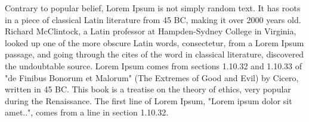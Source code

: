 \documentclass[12pt,letterpaper]{article} %
\begin{document}
	Contrary to popular belief, Lorem Ipsum is not simply random text. It has roots in a piece of classical Latin literature from 45 BC, making it over 2000 years old. Richard McClintock, a Latin professor at Hampden-Sydney College in Virginia, looked up one of the more obscure Latin words, consectetur, from a Lorem Ipsum passage, and going through the cites of the word in classical literature, discovered the undoubtable source. Lorem Ipsum comes from sections 1.10.32 and 1.10.33 of "de Finibus Bonorum et Malorum" (The Extremes of Good and Evil) by Cicero, written in 45 BC. This book is a treatise on the theory of ethics, very popular during the Renaissance. The first line of Lorem Ipsum, "Lorem ipsum dolor sit amet..", comes from a line in section 1.10.32.
	
\end{document}
